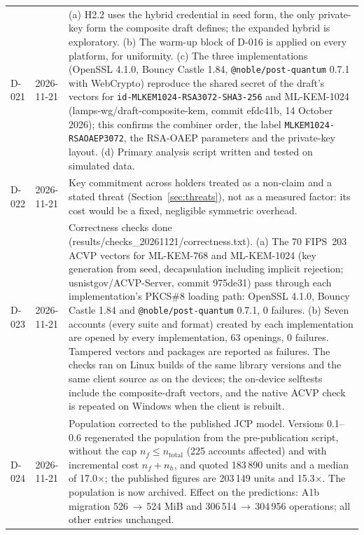 \documentclass[11pt,a4paper]{article}
\begin{document}
\begin{longtable}{l l p{11.5cm}}
D-021 & 2026-11-21 & (a) H2.2 uses the hybrid credential in seed form, the only private-key form the composite draft defines; the expanded hybrid is exploratory. (b) The warm-up block of D-016 is applied on every platform, for uniformity. (c) The three implementations (OpenSSL 4.1.0, Bouncy Castle 1.84, \texttt{@noble/\allowbreak{}post-quantum} 0.7.1 with WebCrypto) reproduce the shared secret of the draft's vectors for \texttt{id-MLKEM1024-RSA3072-SHA3-256} and ML-KEM-1024 (lamps-wg/draft-composite-kem, commit efdc41b, 14 October 2026); this confirms the combiner order, the label \texttt{MLKEM1024-RSAOAEP3072}, the RSA-OAEP parameters and the private-key layout. (d) Primary analysis script written and tested on simulated data.\\
D-022 & 2026-11-21 & Key commitment across holders treated as a non-claim and a stated threat (Section~\ref{sec:threats}), not as a measured factor: its cost would be a fixed, negligible symmetric overhead.\\
D-023 & 2026-11-21 & Correctness checks done (results/checks\_20261121/correctness.txt). (a) The 70 FIPS~203 ACVP vectors for ML-KEM-768 and ML-KEM-1024 (key generation from seed, decapsulation including implicit rejection; usnistgov/ACVP-Server, commit 975de31) pass through each implementation's PKCS\#8 loading path: OpenSSL 4.1.0, Bouncy Castle 1.84 and \texttt{@noble/\allowbreak{}post-quantum} 0.7.1, 0 failures. (b) Seven accounts (every suite and format) created by each implementation are opened by every implementation, 63 openings, 0 failures. Tampered vectors and packages are reported as failures. The checks ran on Linux builds of the same library versions and the same client source as on the devices; the on-device selftests include the composite-draft vectors, and the native ACVP check is repeated on Windows when the client is rebuilt.\\
D-024 & 2026-11-21 & Population corrected to the published JCP model. Versions 0.1--0.6 regenerated the population from the pre-publication script, without the cap $n_f \le n_{\mathrm{total}}$ (225 accounts affected) and with incremental cost $n_f + n_h$, and quoted 183\,890 units and a median of 17.0$\times$; the published figures are 203\,149 units and 15.3$\times$. The population is now archived. Effect on the predictions: A1b migration 526\,$\to$\,524 MiB and 306\,514\,$\to$\,304\,956 operations; all other entries unchanged.\\

\end{longtable}
\end{document}
